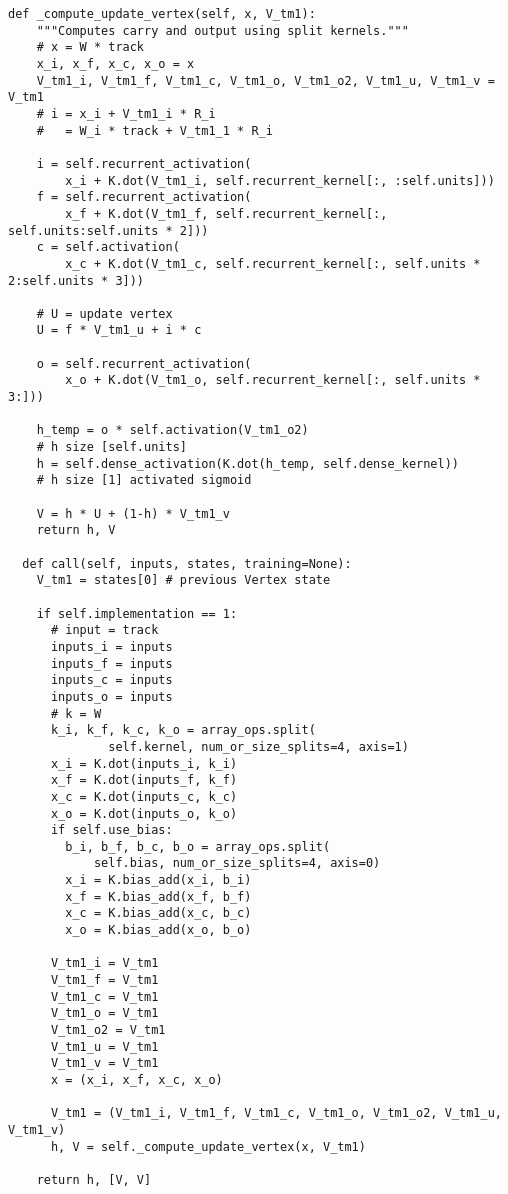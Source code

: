 \begin{lstlisting}[caption=独自のリカレントニューラルネットワーク構造の$1$ステップ, label=VLSTMCellSimple]
  def _compute_update_vertex(self, x, V_tm1):
    """Computes carry and output using split kernels."""
    # x = W * track
    x_i, x_f, x_c, x_o = x
    V_tm1_i, V_tm1_f, V_tm1_c, V_tm1_o, V_tm1_o2, V_tm1_u, V_tm1_v = V_tm1
    # i = x_i + V_tm1_i * R_i
    #   = W_i * track + V_tm1_1 * R_i

    i = self.recurrent_activation(
        x_i + K.dot(V_tm1_i, self.recurrent_kernel[:, :self.units]))
    f = self.recurrent_activation(
        x_f + K.dot(V_tm1_f, self.recurrent_kernel[:, self.units:self.units * 2]))
    c = self.activation(
        x_c + K.dot(V_tm1_c, self.recurrent_kernel[:, self.units * 2:self.units * 3]))

    # U = update vertex
    U = f * V_tm1_u + i * c

    o = self.recurrent_activation(
        x_o + K.dot(V_tm1_o, self.recurrent_kernel[:, self.units * 3:]))

    h_temp = o * self.activation(V_tm1_o2)
    # h size [self.units]
    h = self.dense_activation(K.dot(h_temp, self.dense_kernel))
    # h size [1] activated sigmoid

    V = h * U + (1-h) * V_tm1_v
    return h, V

  def call(self, inputs, states, training=None):
    V_tm1 = states[0] # previous Vertex state

    if self.implementation == 1:
      # input = track
      inputs_i = inputs
      inputs_f = inputs
      inputs_c = inputs
      inputs_o = inputs
      # k = W
      k_i, k_f, k_c, k_o = array_ops.split(
              self.kernel, num_or_size_splits=4, axis=1)
      x_i = K.dot(inputs_i, k_i)
      x_f = K.dot(inputs_f, k_f)
      x_c = K.dot(inputs_c, k_c)
      x_o = K.dot(inputs_o, k_o)
      if self.use_bias:
        b_i, b_f, b_c, b_o = array_ops.split(
            self.bias, num_or_size_splits=4, axis=0)
        x_i = K.bias_add(x_i, b_i)
        x_f = K.bias_add(x_f, b_f)
        x_c = K.bias_add(x_c, b_c)
        x_o = K.bias_add(x_o, b_o)

      V_tm1_i = V_tm1
      V_tm1_f = V_tm1
      V_tm1_c = V_tm1
      V_tm1_o = V_tm1
      V_tm1_o2 = V_tm1
      V_tm1_u = V_tm1
      V_tm1_v = V_tm1
      x = (x_i, x_f, x_c, x_o)

      V_tm1 = (V_tm1_i, V_tm1_f, V_tm1_c, V_tm1_o, V_tm1_o2, V_tm1_u, V_tm1_v)
      h, V = self._compute_update_vertex(x, V_tm1)

    return h, [V, V]
\end{lstlisting}


